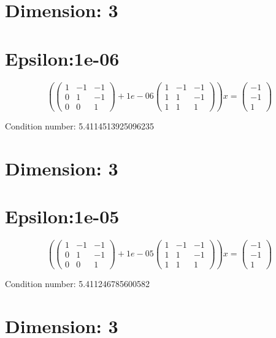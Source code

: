 \documentclass{article}%
\begin{document}
%
\normalsize%
\section{Dimension: 3}%
\label{sec:Dimension3}%
\section{Epsilon:1e{-}06}%
\label{sec:Epsilon1e{-}06}%
\[%
( \begin{pmatrix}%
1&-1&-1\\%
0&1&-1\\%
0&0&1%
\end{pmatrix} + 1e{-}06 \begin{pmatrix}%
1&-1&-1\\%
1&1&-1\\%
1&1&1%
\end{pmatrix} )x = \begin{pmatrix}%
-1\\%
-1\\%
1%
\end{pmatrix}%
\]%
\begin{Large}%
Condition number:%
5.4114513925096235%
\end{Large}

%
\section{Dimension: 3}%
\label{sec:Dimension3}%
\section{Epsilon:1e{-}05}%
\label{sec:Epsilon1e{-}05}%
\[%
( \begin{pmatrix}%
1&-1&-1\\%
0&1&-1\\%
0&0&1%
\end{pmatrix} + 1e{-}05 \begin{pmatrix}%
1&-1&-1\\%
1&1&-1\\%
1&1&1%
\end{pmatrix} )x = \begin{pmatrix}%
-1\\%
-1\\%
1%
\end{pmatrix}%
\]%
\begin{Large}%
Condition number:%
5.411246785600582%
\end{Large}

%
\section{Dimension: 3}%
\label{sec:Dimension3}%
\end{document}
